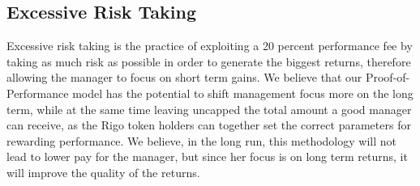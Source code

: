 \documentclass[9pt,oneside]{amsart}
\begin{document}
\begin{multicols}{2}
\subsection{Excessive Risk Taking}
Excessive risk taking is the practice of exploiting a 20 percent performance fee by taking as much risk as possible in order to generate the biggest returns, therefore allowing the manager to focus on short term gains. We believe that our Proof-of-Performance model has the potential to shift management focus more on the long term, while at the same time leaving uncapped the total amount a good manager can receive, as the Rigo token holders can together set the correct parameters for rewarding performance. We believe, in the long run, this methodology will not lead to lower pay for the manager, but since her focus is on long term returns, it will improve the quality of the returns.



\end{multicols}
\end{document}
